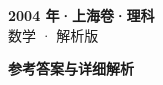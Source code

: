 \documentclass[zihao=-4, a4paper]{ctexart}
\begin{document}
\begin{center}
  {\Large\bfseries 2004 年·上海卷·理科}\\[4pt]
  {\large 数学 · 解析版}
\end{center}
\medskip
{}

\clearpage
{}
\begin{center}{\Large\bfseries 参考答案与详细解析}\end{center}
\medskip

\end{document}
